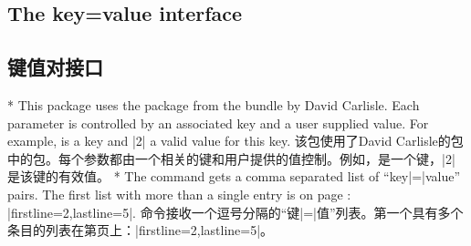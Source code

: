 \begin{paracol}{2}
\subsection{The key=value interface}\label{uTheKey=ValueInterface}
\switchcolumn
\subsection{键值对接口}
\switchcolumn[0]*%
This package uses the  package from the
 bundle by David Carlisle. Each parameter is
controlled by an associated key and a user supplied value. For example,
 is a key and |2| a valid value for this key.
\switchcolumn
该包使用了David Carlisle的包中的包。每个参数都由一个相关的键和用户提供的值控制。例如，是一个键，|2|是该键的有效值。
\switchcolumn[0]*%
The command {\rstyle\icmdname\lstset} gets a comma separated list of
``key|=|value'' pairs. The first list with more than a single entry is on
page \pageref{gFirstKey=ValueList}: |firstline=2,lastline=5|.
\switchcolumn
命令{\rstyle\icmdname\lstset}接收一个逗号分隔的“键|=|值”列表。第一个具有多个条目的列表在第\pageref{gFirstKey=ValueList}页上：|firstline=2,lastline=5|。
\end{paracol}
